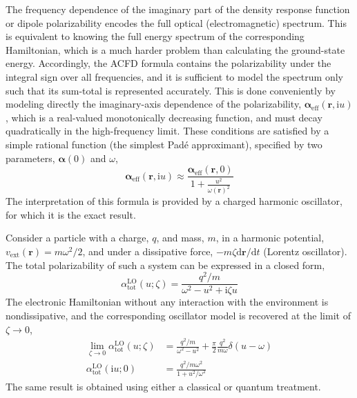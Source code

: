 The frequency dependence of the imaginary part of the density response function or dipole polarizability encodes the full optical (electromagnetic) spectrum.
This is equivalent to knowing the full energy spectrum of the corresponding Hamiltonian, which is a much harder problem than calculating the ground-state energy.
Accordingly, the ACFD formula contains the polarizability under the integral sign over all frequencies, and it is sufficient to model the spectrum only such that its sum-total is represented accurately.
This is done conveniently by modeling directly the imaginary-axis dependence of the polarizability, $\boldsymbol\alpha_\text{eff}(\mathbf r,\mathrm iu)$, which is a real-valued monotonically decreasing function, and must decay quadratically in the high-frequency limit.
These conditions are satisfied by a simple rational function (the simplest Padé approximant), specified by two parameters, $\boldsymbol\alpha(0)$ and $\omega$,
\begin{equation}
  \boldsymbol\alpha_\text{eff}(\mathbf r,\mathrm iu)\approx\frac{\boldsymbol\alpha_\text{eff}(\mathbf r,0)}{1+\frac{u^2}{\omega(\mathbf r)^2}}
\end{equation}
The interpretation of this formula is provided by a charged harmonic oscillator, for which it is the exact result.

Consider a particle with a charge, $q$, and mass, $m$, in a harmonic potential, $v_\text{ext}(\mathbf r)=m\omega^2/2$, and under a dissipative force, $-m\zeta\mathrm d\mathbf r/\mathrm dt$ (Lorentz oscillator).
The total polarizability of such a system can be expressed in a closed form,
\begin{equation}
  \alpha_\text{tot}^\text{LO}(u;\zeta)=\frac{q^2/m}{\omega^2-u^2+\mathrm i\zeta u}
  \label{eq:osc-pol}
\end{equation}
The electronic Hamiltonian without any interaction with the environment is nondissipative, and the corresponding oscillator model is recovered at the limit of $\zeta\rightarrow0$,
\begin{equation}
\begin{aligned}
  \lim_{\zeta\rightarrow 0}\alpha_\text{tot}^\text{LO}(u;\zeta)&=\frac{q^2/m}{\omega^2-u^2}+\frac\pi2\frac{q^2}{m\omega}\delta(u-\omega) \\
  \alpha_\text{tot}^\text{LO}(\mathrm iu;0)&=\frac{q^2/m\omega^2}{1+u^2/\omega^2}
\end{aligned}
\end{equation}
The same result is obtained using either a classical or quantum treatment.

